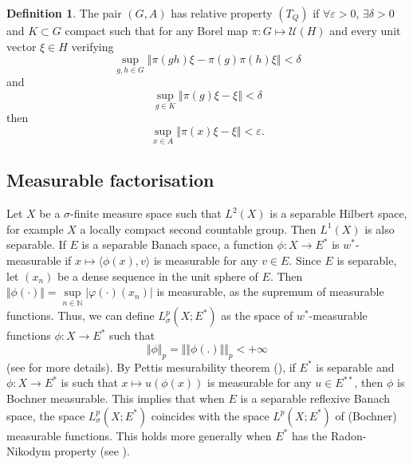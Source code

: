 \documentclass{article}
\theoremstyle{definition}
\newtheorem{definition}[theorem]{Definition}
\theoremstyle{remark}
\numberwithin{equation}{section}
\newcommand{\N}{\mathbb{N}}
\newcommand{\U}{\mathcal{U}}
\begin{document}
\begin{definition}
    The pair $(G,A)$ has relative property $(T_Q)$ if $\forall \varepsilon>0$, $\exists\delta >0$ and $K\subset G$ compact such that for any Borel map $\pi:G\mapsto \U(H)$ and every unit vector $\xi\in H$ verifying \begin{equation}
        \label{eq:tq_h1} \underset{g,h\in G}{\sup} \left\Vert \pi(gh)\xi-\pi(g)\pi(h)\xi\right\Vert<\delta
    \end{equation}and \begin{equation}
        \label{eq:tq_h2} \underset{g\in K}{\sup} \left\Vert \pi(g)\xi-\xi\right\Vert < \delta
    \end{equation}
    then \begin{equation}
        \label{eq:tq_c} \underset{x\in A}{\sup} \left\Vert \pi(x)\xi-\xi\right\Vert < \varepsilon.
    \end{equation}
\end{definition}


\subsection{Measurable factorisation}
Let $X$ be a $\sigma$-finite measure space such that $L^2\left(X\right)$ is a separable Hilbert space, for example $X$ a locally compact second countable group. Then $L^1(X)$ is also separable. If $E$ is a separable Banach space, a function $\phi:X\to E^*$ is $w^*$-measurable if $x\mapsto \langle \phi(x),v\rangle$ is measurable for any $v\in E$. Since $E$ is separable, let $(x_n)$ be a dense sequence in the unit sphere of $E$. Then $\Vert \phi(\cdot)\Vert= \underset{n\in \N}{\sup} \vert \varphi(\cdot)(x_n)\vert$ is measurable, as the supremum of measurable functions. Thus, we can define $L^p_\sigma(X;E^*)$ as the space of $w^*$-measurable functions $\phi:X\to E^*$ such that $$\Vert \phi \Vert_p=\Vert \Vert \phi(.)\Vert \Vert_p<+\infty$$(see \cite{diestel1977vector} for more details). By Pettis mesurability theorem (\cite[Ch. II, Thm. 2]{diestel1977vector}), if $E^*$ is separable and $\phi:X\to E^*$ is such that $x\mapsto u(\phi(x))$ is measurable for any $u\in E^{**}$, then $\phi$ is Bochner measurable. This implies that when $E$ is a separable reflexive Banach space, the space $L^p_\sigma(X;E^*)$ coincides with the space $L^p(X;E^*)$ of (Bochner) measurable functions. This holds more generally when $E^*$ has the Radon-Nikodym property (see \cite[Ch. IV]{diestel1977vector}).\medskip
\end{document}
